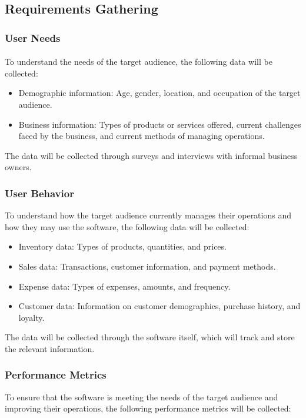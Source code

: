 \documentclass{article}
\begin{document}
\subsection{Requirements Gathering}

\subsubsection{User Needs}
\paragraph*{}
To understand the needs of the target audience, the following data will be collected:

\begin{itemize}
    \item Demographic information: Age, gender, location, and occupation of the target audience.
    \item Business information: Types of products or services offered, current challenges faced by the business, and current methods of managing operations.
\end{itemize}

The data will be collected through surveys and interviews with informal business owners.

\subsubsection{User Behavior}
To understand how the target audience currently manages their operations and how they may use the software, the following data will be collected:

\begin{itemize}
    \item Inventory data: Types of products, quantities, and prices.
    \item Sales data: Transactions, customer information, and payment methods.
    \item Expense data: Types of expenses, amounts, and frequency.
    \item Customer data: Information on customer demographics, purchase history, and loyalty.
\end{itemize}

The data will be collected through the software itself, which will track and store the relevant information.

\subsubsection{Performance Metrics}
To ensure that the software is meeting the needs of the target audience and improving their operations, the following performance metrics will be collected:
\end{document}

